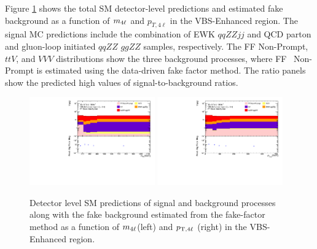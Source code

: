 Figure \ref{fig:MCFFRedStack} shows the total SM detector-level predictions and estimated fake background as a function of $m_{4\ell}$ and $p_{T,4\ell}$ in the VBS-Enhanced region. The signal MC predictions include the combination of EWK $qqZZjj$ and QCD parton and gluon-loop initiated $qqZZ$ $ggZZ$ samples, respectively. The FF Non-Prompt, $ttV$, and $VVV$ distributions show the three background processes, where FF ~Non-Prompt is estimated using the data-driven fake factor method. The ratio panels show the predicted high values of signal-to-background ratios. 

\begin{figure}[!htb]
    \centering
    \includegraphics[width=0.48\textwidth]{figures/Analysis/Background/RedStack_VBSEnhanced_M4l.pdf}
    \includegraphics[width=0.48\textwidth]{figures/Analysis/Background/RedStack_VBSEnhanced_Pt4l.pdf}
    \caption{ Detector level SM predictions of signal and background processes along with the fake background estimated from the fake-factor method as a function of $m_{4\ell}$(left) and $p_{\textrm{T} ,4\ell}$ (right) in the VBS-Enhanced region. \label{fig:MCFFRedStack} }
\end{figure}